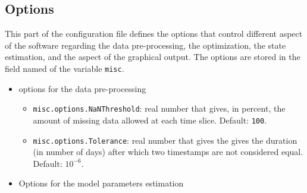 \subsection{Options}
\label{SS:options}
This part of the configuration file defines the options that control different aspect of the software regarding the data pre-processing, the optimization, the state estimation, and the aspect of the graphical output.
The options are stored in the field named  of the \MATLAB{} variable \lstinline[basicstyle = \mlttfamily \small ]!misc!.
\begin{itemize}

\item options for the data pre-processing

\begin{itemize}
\item \lstinline[basicstyle = \mlttfamily \small ]!misc.options.NaNThreshold!: real number that gives, in percent, the amount of missing data allowed at each time slice. Default: \lstinline[basicstyle = \mlttfamily \small ]!100!.
\item \lstinline[basicstyle = \mlttfamily \small ]!misc.options.Tolerance!: real number that gives the gives the duration (in number of days) after which two timestamps are not considered equal. Default: $10^{-6}$.

\end{itemize}


\item Options for the model parameters estimation


\end{itemize}
